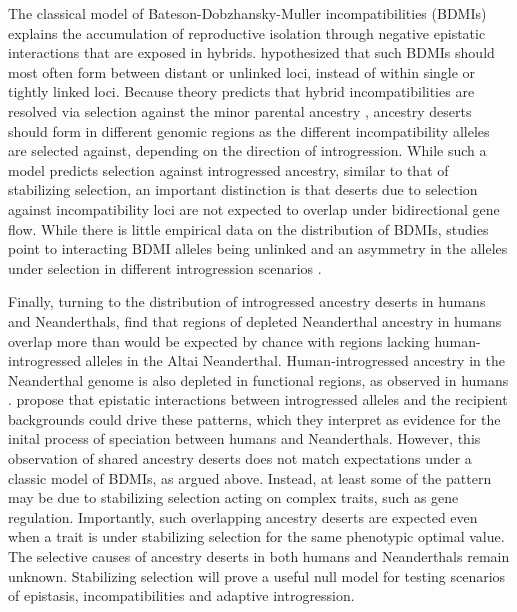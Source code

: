 \documentclass{article}
\begin{document}
The classical model of Bateson-Dobzhansky-Muller incompatibilities (BDMIs)
\citep{bateson1909heredity,dobzhansky1936studies,muller1942isolating} explains
the accumulation of reproductive isolation through negative epistatic
interactions that are exposed in hybrids. \citet{muller1942isolating}
hypothesized that such BDMIs should most often form between distant or unlinked
loci, instead of within single or tightly linked loci. Because theory predicts
that hybrid incompatibilities are resolved via selection against the minor
parental ancestry \citep{moran2021genomic}, ancestry deserts should form in
different genomic regions as the different incompatibility alleles are selected
against, depending on the direction of introgression. While such a model
predicts selection against introgressed ancestry, similar to that of
stabilizing selection, an important distinction is that deserts due to
selection against incompatibility loci are not expected to overlap under
bidirectional gene flow. While there is little empirical data on the
distribution of BDMIs, studies point to interacting BDMI alleles being unlinked
\citep[][e.g.,]{presgraves2003fine} and an asymmetry in the alleles under
selection in different introgression scenarios
\citep{maheshwari2011genetics,moran2021genomic}.

Finally, turning to the distribution of introgressed ancestry deserts in humans
and Neanderthals, \citet{harris2023diverse} find that regions of depleted
Neanderthal ancestry in humans overlap more than would be expected by chance
with regions lacking human-introgressed alleles in the Altai Neanderthal.
Human-introgressed ancestry in the Neanderthal genome is also depleted in
functional regions, as observed in humans \citep{sankararaman2014genomic}.
\citet{harris2023diverse} propose that epistatic interactions between
introgressed alleles and the recipient backgrounds could drive these patterns,
which they interpret as evidence for the inital process of speciation between
humans and Neanderthals. However, this observation of shared ancestry deserts
does not match expectations under a classic model of BDMIs, as argued above.
Instead, at least some of the pattern may be due to stabilizing selection
acting on complex traits, such as gene regulation.  Importantly, such
overlapping ancestry deserts are expected even when a trait is under
stabilizing selection for the same phenotypic optimal value. The selective
causes of ancestry deserts in both humans and Neanderthals remain unknown.
Stabilizing selection will prove a useful null model for testing scenarios of
epistasis, incompatibilities and adaptive introgression.
\end{document}
